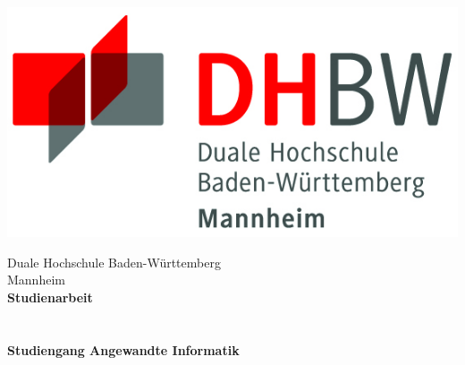 \begin{titlepage}
\begin{minipage}{\textwidth}
		\vspace{-2cm}
		\noindent \begin{center}
		\includegraphics{Bilder/logo.jpg}
	\end{center}		 
\end{minipage}
\vspace{1em}
\sffamily
\begin{center}
	\textsf{\large{}Duale Hochschule Baden-W\"urttemberg\\[1.5mm] Mannheim}\\[2em]
	\textsf{\textbf{\large{}Studienarbeit}}\\[3mm]
	\textsf{\textbf{\Large{}\DerTitelDerArbeit}} \\[0.3cm]
	\textsf{\textbf{\large{}\DerUnterTitelDerArbeit}} \\[1.5cm]
	\textsf{\textbf{\large{}Studiengang Angewandte Informatik}}%
	
\vfill

\begin{minipage}{\textwidth}


\end{minipage}
\end{center}
\end{titlepage}
